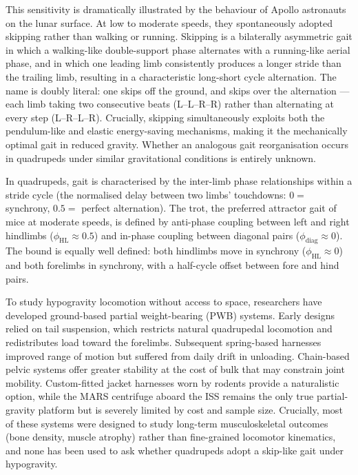 \documentclass[blue]{enslyonstage}
\begin{document}
This sensitivity is dramatically illustrated by the behaviour of Apollo
astronauts on the lunar surface. At low to moderate speeds, they spontaneously
adopted skipping rather than walking or
running\cite{minettiBiomechanicsSkippingGaits1998,paveiSkippingVsRunning2015}.
Skipping is a bilaterally asymmetric gait in which a walking-like
double-support phase alternates with a running-like aerial phase, and in which
one leading limb consistently produces a longer stride than the trailing limb,
resulting in a characteristic long-short cycle
alternation\cite{minettiBiomechanicsSkippingGaits1998}. The name is doubly
literal: one skips off the ground, and skips over the alternation --- each
limb taking two consecutive beats (\mbox{L--L--R--R}) rather than alternating
at every step (\mbox{L--R--L--R}). Crucially, skipping simultaneously exploits
both the pendulum-like and elastic energy-saving mechanisms, making it the
mechanically optimal gait in reduced
gravity\cite{minettiBiomechanicsSkippingGaits1998}. Whether an analogous gait
reorganisation occurs in quadrupeds under similar gravitational conditions is
entirely unknown.

In quadrupeds, gait is characterised by the inter-limb phase relationships
within a stride cycle\cite{dannerSpinalControlLocomotion2023} (the normalised
delay between two limbs' touchdowns: $0 =$ synchrony, $0.5 =$ perfect
alternation). The trot, the preferred attractor gait of mice at moderate
speeds, is defined by anti-phase coupling between left and right hindlimbs
($\phi_\text{HL} \approx 0.5$) and in-phase coupling between diagonal pairs
($\phi_\text{diag} \approx 0$)\cite{dannerSpinalControlLocomotion2023}. The
bound is equally well defined: both hindlimbs move in synchrony
($\phi_\text{HL} \approx 0$) and both forelimbs in synchrony, with a
half-cycle offset between fore and hind pairs.

To study hypogravity locomotion without access to space, researchers have
developed ground-based partial weight-bearing (PWB) systems. Early designs
relied on tail suspension, which restricts natural quadrupedal locomotion and
redistributes load toward the
forelimbs\cite{mortreuxApproachingGravityContinuum2020}. Subsequent
spring-based harnesses improved range of motion but suffered from daily drift
in unloading\cite{mortreuxApproachingGravityContinuum2020}. Chain-based pelvic
systems offer greater stability at the cost of bulk that may constrain joint
mobility\cite{mortreuxApproachingGravityContinuum2020}. Custom-fitted jacket
harnesses worn by rodents provide a naturalistic
option\cite{mortreuxApproachingGravityContinuum2020}, while the MARS
centrifuge aboard the ISS remains the only true partial-gravity platform but is
severely limited by cost and sample size\cite{shibaDevelopmentNewExperimental2017}.
Crucially, most of these systems were designed to study long-term
musculoskeletal outcomes (bone density, muscle atrophy) rather than
fine-grained locomotor kinematics, and none has been used to ask whether
quadrupeds adopt a skip-like gait under hypogravity.
\end{document}
